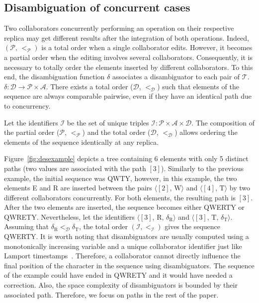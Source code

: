 \subsection{Disambiguation of concurrent cases}
\label{subsec:disambiguation}

Two collaborators concurrently performing an operation on their respective
replica may get different results after the integration of both
operations. Indeed, $(\mathcal{P},\,<_\mathcal{P})$ is a total order when a
single collaborator edits. However, it becomes a partial order when the editing
involves several collaborators. Consequently, it is necessary to totally order
the elements inserted by different collaborators. To this end, the
disambiguation function $\delta$ associates a disambiguator to each pair of
$\mathcal{T}$. $\delta: \mathcal{D} \rightarrow \mathcal{P}\times\mathcal{A}$.
There exists a total order ($\mathcal{D}$, $<_{\mathcal{D}}$) such that elements
of the sequence are always comparable pairwise, even if they have an identical
path due to concurrency. 

Let the identifiers $\mathcal{I}$ be the set of unique triples
$\mathcal{I}:\mathcal{P}\times \mathcal{A}\times \mathcal{D}$. The composition
of the partial order ($\mathcal{P}$, $<_{\mathcal{P}}$) and the total order
($\mathcal{D}$, $<_{\mathcal{D}}$) allows ordering the elements of the sequence
identically at any replica.

Figure~\ref{fig:desexample} depicts a tree containing 6 elements with only 5
distinct paths (two values are associated with the path $[3]$). Similarly to the
previous example, the initial sequence was QWTY, however, in this example, the
two elements E and R are inserted between the pairs
$\langle [2],\, \text{W}\rangle$ and $\langle [4],\, \text{T}\rangle$ by two
different collaborators concurrently. For both elements, the resulting path is
$[3]$. After the two elements are inserted, the sequence becomes either QWERTY
or QWRETY. Nevertheless, let the identifiers
$\langle [3],\, \text{R},\, \delta_\text{R}\rangle$ and
$\langle [3],\, \text{T},\, \delta_\text{T} \rangle$. Assuming that
$\delta_\text{R} <_\mathcal{D} \delta_\text{T}$, the total order
$(\mathcal{I}, <_\mathcal{I})$ gives the sequence QWERTY. It is worth noting
that disambiguators are usually computed using a monotonically increasing
variable and a unique collaborator identifier just like Lamport
timestamps~\cite{lamport1978time}. Therefore, a collaborator cannot directly
influence the final position of the character in the sequence using
disambiguators. The sequence of the example could have ended in QWRETY and it
would have needed a correction. Also, the space complexity of disambiguators is
bounded by their associated path. Therefore, we focus on paths in the rest of
the paper.

